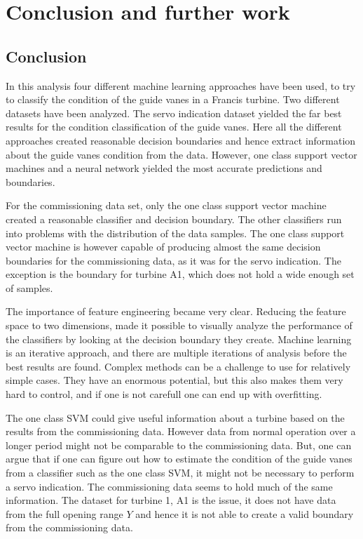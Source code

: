 

\section{Conclusion and further work}

\subsection{Conclusion}
    
    In this analysis four different machine learning approaches have been used, to try to classify the condition of the guide vanes in a Francis turbine. Two different datasets have been analyzed. The servo indication dataset yielded the far best results for the condition classification of the guide vanes. Here all the different approaches created reasonable decision boundaries and hence extract information about the guide vanes condition from the data. However, one class support vector machines and a neural network yielded the most accurate predictions and boundaries.   
    
    For the commissioning data set, only the one class support vector machine created a reasonable classifier and decision boundary. The other classifiers run into problems with the distribution of the data samples. The one class support vector machine is however capable of producing almost the same decision boundaries for the commissioning data, as it was for the servo indication. The exception is the boundary for turbine A1, which does not hold a wide enough set of samples.  
    
    The importance of feature engineering became very clear. Reducing the feature space to two dimensions, made it possible to visually analyze the performance of the classifiers by looking at the decision boundary they create. Machine learning is an iterative approach, and there are multiple iterations of analysis before the best results are found. Complex methods can be a challenge to use for relatively simple cases. They have an enormous potential, but this also makes them very hard to control, and if one is not carefull one can end up with overfitting. 
    
    The one class SVM could give useful information about a turbine based on the results from the commissioning data. However data from normal operation over a longer period might not be comparable to the commissioning data. But, one can argue that if one can figure out how to estimate the condition of the guide vanes from a classifier such as the one class SVM, it might not be necessary to perform a servo indication. The commissioning data seems to hold much of the same information. The dataset for turbine 1, A1 is the issue, it does not have data from the full opening range $Y$ and hence it is not able to create a valid boundary from the commissioning data. 
    
